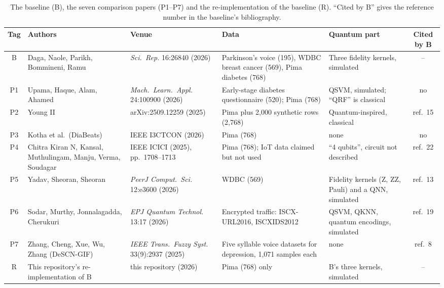 \documentclass[11pt,a4paper]{article}
\begin{document}
\begin{table}[H]
\centering\footnotesize
\caption{The baseline (B), the seven comparison papers (P1--P7) and the re-implementation of the baseline (R). ``Cited by B'' gives the reference number in the baseline's bibliography.}
\label{tab:papers}
\begin{tabularx}{\textwidth}{c L{3.3cm} L{3.1cm} Y L{2.6cm} c}
\toprule
Tag & Authors & Venue & Data & Quantum part & Cited by B \\
\midrule
B & Daga, Naole, Parikh, Bommineni, Ramu & \emph{Sci.\ Rep.} 16:26840 (2026) & Parkinson's voice (195), WDBC breast cancer (569), Pima diabetes (768) & Three fidelity kernels, simulated & -- \\
P1 & Upama, Haque, Alam, Ahamed & \emph{Mach.\ Learn.\ Appl.} 24:100900 (2026) & Early-stage diabetes questionnaire (520); Pima (768) & QSVM, simulated; ``QRF'' is classical & no \\
P2 & Young II & arXiv:2509.12259 (2025) & Pima plus 2,000 synthetic rows (2,768) & Quantum-inspired, classical & ref.\ 15 \\
P3 & Kotha et al.\ (DiaBeats) & IEEE I3CTCON (2026) & Pima (768) & none & no \\
P4 & Chitra Kiran N, Kansal, Muthulingam, Manju, Verma, Soudagar & IEEE ICICI (2025), pp.\ 1708--1713 & Pima (768); IoT data claimed but not used & ``4 qubits'', circuit not described & ref.\ 22 \\
P5 & Yadav, Sheoran, Sheoran & \emph{PeerJ Comput.\ Sci.} 12:e3600 (2026) & WDBC (569) & Fidelity kernels (Z, ZZ, Pauli) and a QNN, simulated & ref.\ 13 \\
P6 & Sodar, Murthy, Jonnalagadda, Cherukuri & \emph{EPJ Quantum Technol.} 13:17 (2026) & Encrypted traffic: ISCX-URL2016, ISCXIDS2012 & QSVM, QKNN, quantum encodings, simulated & ref.\ 19 \\
P7 & Zhang, Cheng, Xue, Wu, Zhang (DeSCN-GIF) & \emph{IEEE Trans.\ Fuzzy Syst.} 33(9):2937 (2025) & Five syllable voice datasets for depression, 1,071 samples each & none & ref.\ 8 \\
\midrule
R & This repository's re-implementation of B & this repository (2026) & Pima (768) only & B's three kernels, simulated & -- \\
\bottomrule
\end{tabularx}
\end{table}

\end{document}
